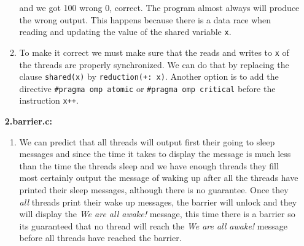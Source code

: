 \begin{enumerate}[label=\textbf{\Alph*)}]
\begin{enumerate}[label=\arabic*.]
        and we got 100 wrong 0, 
        correct. The program almost always will produce the wrong output. This happens because there is a data race when reading and updating the value
        of the shared variable \texttt{x}.
        \item To make it correct we must make sure that the reads and writes to \texttt{x} of the threads are properly synchronized. We can do that
        by replacing the clause \texttt{shared(x)} by \texttt{reduction(+: x)}. Another option is to add the directive \texttt{\#pragma omp atomic} or 
        \texttt{\#pragma omp critical} before the instruction \texttt{x++}.
    \end{enumerate}
    \textbf{2.barrier.c:}
    \begin{enumerate}[label=\arabic*.]
        \item We can predict that all threads will output first their going to sleep messages and since the time it takes to display the message is
        much less than the time the threads sleep and we have enough threads they fill most certainly output the message of waking up after all the threads
        have printed their sleep messages, although there is no guarantee. Once they \emph{all} threads print their wake up messages, the barrier will
        unlock and they will display the \emph{We are all awake!} message, this time there is a barrier so its guaranteed that no thread will
        reach the \emph{We are all awake!} message before all threads have reached the barrier.
        

\end{enumerate}
\end{enumerate}
